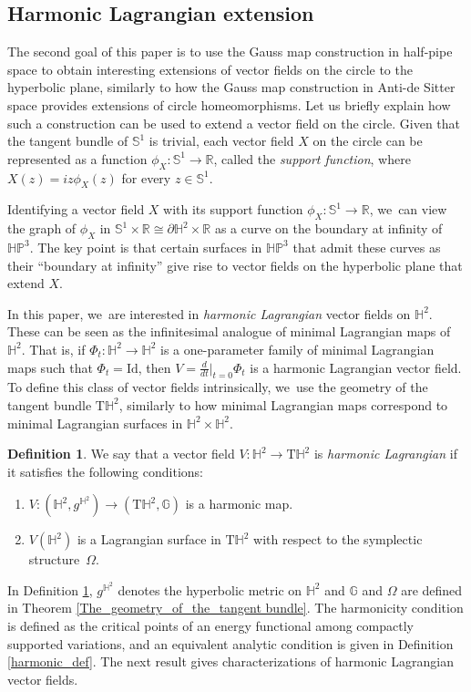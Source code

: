 \documentclass[10pt]{amsart}
\theoremstyle{plain}
\theoremstyle{definition}
\newtheorem{defi}[cor]{Definition}
\newcommand{\HP}{\mathbb{HP}^3}
\begin{document}
\subsection{Harmonic Lagrangian extension}

The second goal of this paper is to use the Gauss map construction in half-pipe space to obtain interesting extensions of vector fields on the circle to the hyperbolic plane, similarly to how the Gauss map construction in Anti-de Sitter space provides extensions of circle homeomorphisms. Let us briefly explain how such a construction can be used to extend a vector field on the circle. Given that the tangent bundle of \(\mathbb{S}^1\) is trivial, each vector field \(X\) on the circle can be represented as a function \(\phi_X: \mathbb{S}^1 \to \mathbb{R}\), called the \emph{support function}, where \(X(z) = iz\phi_X(z)\) for every \(z \in \mathbb{S}^1\).

Identifying a vector field \(X\) with its support function \(\phi_X: \mathbb{S}^1 \to \mathbb{R}\), we~can view the graph of \(\phi_X\) in \(\mathbb{S}^1 \times \mathbb{R} \cong \partial \mathbb{H}^2 \times \mathbb{R}\) as a curve on the boundary at infinity of \(\HP\). The key point is that certain surfaces in \(\HP\) that admit these curves as their ``boundary at infinity'' give rise to vector fields on the hyperbolic plane that extend \(X\).

In this paper, we~are interested in \emph{harmonic Lagrangian} vector fields on \(\mathbb{H}^2\). These can be seen as the infinitesimal analogue of minimal Lagrangian maps of \(\mathbb{H}^2\). That is, if \(\Phi_t: \mathbb{H}^2 \to \mathbb{H}^2\) is a one-parameter family of minimal Lagrangian maps such that \(\Phi_t = \mathrm{Id}\), then \(V = \frac{d}{dt}\big\lvert_{t=0} \Phi_t\) is a harmonic Lagrangian vector field. To define this class of vector fields intrinsically, we~use the geometry of the tangent bundle \(\mathrm{T}\mathbb{H}^2\), similarly to how minimal Lagrangian maps correspond to minimal Lagrangian surfaces in \(\mathbb{H}^2 \times \mathbb{H}^2\).

\begin{defi}\label{intro_def1}
We say that a vector field \(V: \mathbb{H}^2 \to \mathrm{T}\mathbb{H}^2\) is \emph{harmonic Lagrangian} if it satisfies the following conditions:
\begin{enumerate}
\item \(V: (\mathbb{H}^2, g^{\mathbb{H}^2}) \to (\mathrm{T}\mathbb{H}^2, \mathbb{G})\) is a harmonic map.
\item \(V(\mathbb{H}^2)\) is a Lagrangian surface in \(\mathrm{T}\mathbb{H}^2\) with respect to the symplectic structure~\(\Omega\).
\end{enumerate}
\end{defi}
In Definition \ref{intro_def1}, \(g^{\mathbb{H}^2}\) denotes the hyperbolic metric on \(\mathbb{H}^2\) and \(\mathbb{G}\) and \(\Omega\) are defined in Theorem \ref{The_geometry_of_the_tangent bundle}. The harmonicity condition is defined as the critical points of an energy functional among compactly supported variations, and an equivalent analytic condition is given in Definition \ref{harmonic_def}. The next result gives characterizations of harmonic Lagrangian vector fields.
\end{document}
